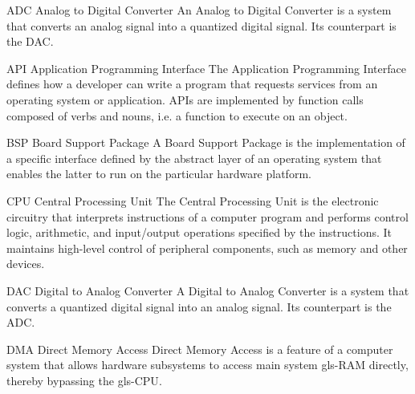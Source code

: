 \usepackage[xindy, nopostdot, numberedsection, style=super, section, toc, acronyms, nogroupskip]{glossaries}
\usepackage{xparse}

\setlength{\glsdescwidth}{0.8\textwidth}
\renewcommand{\glsnamefont}[1]{\textbf{#1}}

 {
}

\makeglossaries

%
  {ADC}%
  {Analog to Digital Converter}%
  {An Analog to Digital Converter is a system that converts an analog signal
   into a quantized digital signal. Its counterpart is the \gls{DAC}.}%

%
  {API}%
  {Application Programming Interface}%
  {The Application Programming Interface defines how a developer can write
   a program that requests services from an operating system or application.
   \glspl{API} are implemented by function calls composed of verbs and nouns,
   i.e. a function to execute on an object.}%

%
  {BSP}%
  {Board Support Package}%
  {A Board Support Package is the implementation of a specific interface defined
   by the abstract layer of an operating system that enables the latter to run
   on the particular hardware platform.}%

%
  {CPU}%
  {Central Processing Unit}%
  {The Central Processing Unit is the electronic circuitry that interprets
  instructions of a computer program and performs control logic, arithmetic,
  and input/output operations specified by the instructions. It maintains
  high-level control of peripheral components, such as memory and other devices.}%

%
  {DAC}%
  {Digital to Analog Converter}%
  {A Digital to Analog Converter is a system that converts a quantized digital
   signal into an analog signal. Its counterpart is the \gls{ADC}.}%

%
  {DMA}%
  {Direct Memory Access}%
  {Direct Memory Access is a feature of a computer system that allows hardware
   subsystems to access main system \gls{gls-RAM} directly, thereby bypassing
   the \gls{gls-CPU}.}%

